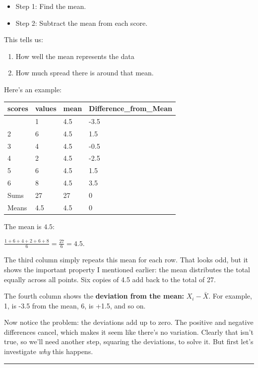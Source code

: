 \documentclass[
  letterpaper,
  DIV=11,
  numbers=noendperiod]{scrreprt}
\begin{document}
\begin{itemize}
\item
  Step 1: Find the mean.
\item
  Step 2: Subtract the mean from each score.
\end{itemize}

This tells us:

\begin{enumerate}
\def\labelenumi{\arabic{enumi}.}
\item
  How well the mean represents the data
\item
  How much spread there is around that mean.
\end{enumerate}

Here's an example:

\begin{longtable}[]{@{}llll@{}}
\toprule\noalign{}
scores & values & mean & Difference\_from\_Mean \\
\midrule\noalign{}
\endhead
\bottomrule\noalign{}
\endlastfoot
1 & 1 & 4.5 & -3.5 \\
2 & 6 & 4.5 & 1.5 \\
3 & 4 & 4.5 & -0.5 \\
4 & 2 & 4.5 & -2.5 \\
5 & 6 & 4.5 & 1.5 \\
6 & 8 & 4.5 & 3.5 \\
Sums & 27 & 27 & 0 \\
Means & 4.5 & 4.5 & 0 \\
\end{longtable}

The mean is \(4.5\):

\(\frac{1+6+4+2+6+8}{6} = \frac{27}{6} = 4.5\).

The third column simply repeats this mean for each row. That looks odd,
but it shows the important property I mentioned earlier: the mean
distributes the total equally across all points. Six copies of 4.5 add
back to the total of 27.

The fourth column shows the \textbf{deviation from the mean:}
\(X_{i}-\bar{X}\). For example, 1, is -3.5 from the mean, 6, is +1.5,
and so on.

Now notice the problem: the deviations add up to zero. The positive and
negative differences cancel, which makes it seem like there's no
variation. Clearly that isn't true, so we'll need another step, squaring
the deviations, to solve it. But first let's investigate \emph{why} this
happens.

\begin{center}\rule{0.5\linewidth}{0.5pt}\end{center}
\end{document}
